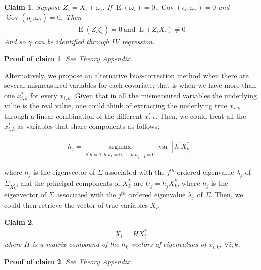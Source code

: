 \documentclass[10pt]{article}
\newtheorem{claim}{Claim}
\newtheorem{claimproof}{Proof of claim}[claim]
\begin{document}
        \begin{claim}
        Suppose $ Z_i=X_i+\omega_i$. If $\operatorname{E}(\omega_i)=0$, $\operatorname{Cov}(\epsilon_i,\omega_i)=0$ and $\operatorname{Cov}(\eta_i,\omega_i)=0$. Then
        \begin{align}
        \operatorname{E}(Z_i\zeta_i)=0 \ \text{and} \  \operatorname{E}(Z_iX_i)\neq0
        \end{align}
        And so $\gamma$ can be identified through IV regression.
        \end{claim}

        \begin{claimproof}
        See Theory Appendix.
        \end{claimproof}
        
        Alternatively, we propose an alternative bias-correction method when there are several mismeasured variables for each covariate; that is when we have more than one $x_{i,k}^*$ for every $x_{i,k}$. Given that in all the mismeasured variables the underlying value is the real value, one could think of extracting the underlying true $x_{i,k}$ through a linear combination of the different $x_{i,k}^*$. Then, we could treat all the $x_{i,k}^*$ as variables that share components as follows:

        \begin{align}
           h_{j}=\underset{h^{\prime} h=1, h^{\prime} h_{1}=0, \ldots, h^{\prime} h_{j-1}=0}{\operatorname{argmax}} \operatorname{var}\left[h^{\prime} X^*_k\right]  
        \end{align}
        
        where $h_j$ is the eigenvector of $\Sigma$ associated with the $j^{t h}$ ordered eigenvalue $\lambda_{j}$ of $\Sigma_{X^*_k}$, and the principal components of $X^*_k$ are $U_{j}=h_{j}^{\prime} X^*_k$, where $h_{j}$ is the eigenvector of $\Sigma$ associated with the $j^{t h}$ ordered eigenvalue $\lambda_{j}$ of $\Sigma$. Then, we could then retrieve the vector of true variables $X_i$.

        \begin{claim}
            \begin{align}
                X_i=HX^*_i
            \end{align}
        where $H$ is a matrix compound of the $h_k$ vectors of eigenvalues of $x_{i,k}$, $\forall i,k$.
        \end{claim}

        \begin{claimproof}
            See Theory Appendix.
        \end{claimproof}
 
\end{document}
